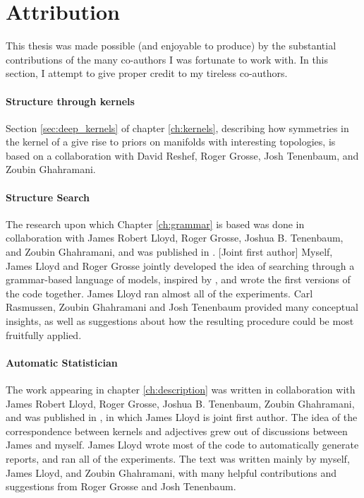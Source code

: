 \section{Attribution}

This thesis was made possible (and enjoyable to produce) by the substantial contributions of the many co-authors I was fortunate to work with.
In this section, I %
attempt to give proper credit to my tireless co-authors.

\paragraph{Structure through kernels}
Section \ref{sec:deep_kernels} of chapter \ref{ch:kernels}, describing how symmetries in the kernel of a \gplvm{} give rise to priors on manifolds with interesting topologies, is based on a collaboration with David Reshef, Roger Grosse, Josh Tenenbaum, and Zoubin Ghahramani.

\paragraph{Structure Search}
The research upon which Chapter \ref{ch:grammar} is based was done in collaboration with James Robert Lloyd, Roger Grosse, Joshua B. Tenenbaum, and Zoubin Ghahramani, and was published in \citep{DuvLloGroetal13}.
[Joint first author]
Myself, James Lloyd and Roger Grosse jointly developed the idea of searching through a grammar-based language of \gp{} models, inspired by \citet{grosse2012exploiting}, and wrote the first versions of the code together.
James Lloyd ran almost all of the experiments.
 Carl Rasmussen, Zoubin Ghahramani and Josh Tenenbaum provided many conceptual insights, as well as suggestions about how the resulting procedure could be most fruitfully applied.

\paragraph{Automatic Statistician} The work appearing in chapter \ref{ch:description} was written in collaboration with James Robert Lloyd, Roger Grosse, Joshua B. Tenenbaum, Zoubin Ghahramani, and was published in \citep{LloDuvGroetal14}, in which James Lloyd is joint first author.
The idea of the correspondence between kernels and adjectives grew out of discussions between James and myself.
James Lloyd wrote most of the code to automatically generate reports, and ran all of the experiments.
The text was written mainly by myself, James Lloyd, and Zoubin Ghahramani, with many helpful contributions and suggestions from Roger Grosse and Josh Tenenbaum.

